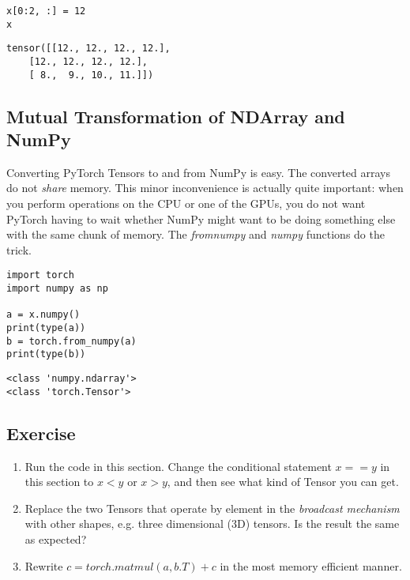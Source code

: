 \documentclass[]{article}
\begin{document}
\begin{verbatim}
x[0:2, :] = 12
x
\end{verbatim}

\begin{verbatim}
tensor([[12., 12., 12., 12.],
	[12., 12., 12., 12.],
	[ 8.,  9., 10., 11.]])
\end{verbatim}

\subsection{Mutual Transformation of NDArray and NumPy}

Converting PyTorch Tensors to and from NumPy is easy. The converted arrays do not \textit{share} memory. This minor inconvenience is actually quite important: when you perform operations on the CPU or one of the GPUs, you do not want PyTorch having to wait whether NumPy might want to be doing something else with the same chunk of memory. The \textit{from\textunderscore numpy} and \textit{numpy} functions do the trick.

\begin{verbatim}
import torch
import numpy as np

a = x.numpy()
print(type(a))
b = torch.from_numpy(a)
print(type(b))
\end{verbatim}

\begin{verbatim}
<class 'numpy.ndarray'>
<class 'torch.Tensor'>
\end{verbatim}

\subsection{Exercise}

\begin{enumerate}
	\item Run the code in this section. Change the conditional statement $ x == y $ in this section to $ x < y $ or $ x > y $, and then see what kind of Tensor you can get.
	\item Replace the two Tensors that operate by element in the \textit{broadcast mechanism} with other shapes, e.g. three dimensional (3D) tensors. Is the result the same as expected?
	\item Rewrite $ c = torch.matmul(a, b.T) + c $ in the most memory efficient manner.
\end{enumerate}
\end{document}
